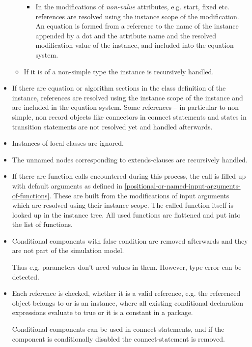 \begin{itemize}
\begin{itemize}
    \begin{itemize}
    \item
      In the modifications of \emph{non-value} attributes, e.g. start,
      fixed etc. references are resolved using the instance scope of the
      modification. An equation is formed from a reference to the name
      of the instance appended by a dot and the attribute name and the
      resolved modification value of the instance, and included into the
      equation system.
    \end{itemize}
  \item
    If it is of a non-simple type the instance is recursively handled.
  \end{itemize}
\item
  If there are equation or algorithm sections in the class definition of
  the instance, references are resolved using the instance scope of the
  instance and are included in the equation system. Some references --
  in particular to non simple, non record objects like connectors in
  connect statements and states in transition statements are not
  resolved yet and handled afterwards.
\item
  Instances of local classes are ignored.
\item
  The unnamed nodes corresponding to extends-clauses are recursively
  handled.
\item
  If there are function calls encountered during this process, the call
  is filled up with default arguments as defined in \autoref{positional-or-named-input-arguments-of-functions}. These are
  built from the modifications of input arguments which are resolved
  using their instance scope. The called function itself is looked up in
  the instance tree. All used functions are flattened and put into the
  list of functions.
\item
  Conditional components with false condition are removed afterwards and
  they are not part of the simulation model.
  \begin{nonnormative}
  Thus e.g. parameters don't need values in them. However, type-error can be detected.
  \end{nonnormative}
\item
  Each reference is checked, whether it is a valid reference, e.g. the
  referenced object belongs to or is an instance, where all existing
  conditional declaration expressions evaluate to true or it is a
  constant in a package.
  \begin{nonnormative}
  Conditional components can be used in connect-statements, and if the component is conditionally disabled the connect-statement is removed.
  \end{nonnormative}
\end{itemize}

